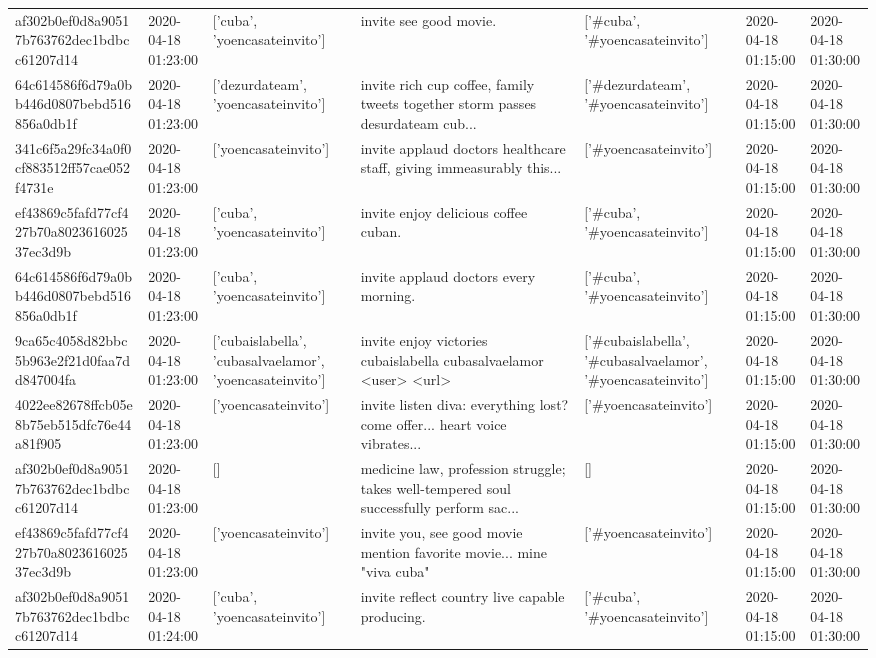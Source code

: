 \begin{tabular}{lllllll}
af302b0ef0d8a90517b763762dec1bdbcc61207d14 & 2020-04-18 01:23:00 & ['cuba', 'yoencasateinvito'] & invite see good movie. & ['#cuba', '#yoencasateinvito'] & 2020-04-18 01:15:00 & 2020-04-18 01:30:00 \\
64c614586f6d79a0bb446d0807bebd516856a0db1f & 2020-04-18 01:23:00 & ['dezurdateam', 'yoencasateinvito'] & invite rich cup coffee, family tweets together storm passes desurdateam cub... & ['#dezurdateam', '#yoencasateinvito'] & 2020-04-18 01:15:00 & 2020-04-18 01:30:00 \\
341c6f5a29fc34a0f0cf883512ff57cae052f4731e & 2020-04-18 01:23:00 & ['yoencasateinvito'] & invite applaud doctors healthcare staff, giving immeasurably this... & ['#yoencasateinvito'] & 2020-04-18 01:15:00 & 2020-04-18 01:30:00 \\
ef43869c5fafd77cf427b70a802361602537ec3d9b & 2020-04-18 01:23:00 & ['cuba', 'yoencasateinvito'] & invite enjoy delicious coffee cuban. & ['#cuba', '#yoencasateinvito'] & 2020-04-18 01:15:00 & 2020-04-18 01:30:00 \\
64c614586f6d79a0bb446d0807bebd516856a0db1f & 2020-04-18 01:23:00 & ['cuba', 'yoencasateinvito'] & invite applaud doctors every morning. & ['#cuba', '#yoencasateinvito'] & 2020-04-18 01:15:00 & 2020-04-18 01:30:00 \\
9ca65c4058d82bbc5b963e2f21d0faa7dd847004fa & 2020-04-18 01:23:00 & ['cubaislabella', 'cubasalvaelamor', 'yoencasateinvito'] & invite enjoy victories cubaislabella cubasalvaelamor <user> <url> & ['#cubaislabella', '#cubasalvaelamor', '#yoencasateinvito'] & 2020-04-18 01:15:00 & 2020-04-18 01:30:00 \\
4022ee82678ffcb05e8b75eb515dfc76e44a81f905 & 2020-04-18 01:23:00 & ['yoencasateinvito'] & invite listen diva: everything lost? come offer... heart voice vibrates... & ['#yoencasateinvito'] & 2020-04-18 01:15:00 & 2020-04-18 01:30:00 \\
af302b0ef0d8a90517b763762dec1bdbcc61207d14 & 2020-04-18 01:23:00 & [] & medicine law, profession struggle; takes well-tempered soul successfully perform sac... & [] & 2020-04-18 01:15:00 & 2020-04-18 01:30:00 \\
ef43869c5fafd77cf427b70a802361602537ec3d9b & 2020-04-18 01:23:00 & ['yoencasateinvito'] & invite you, see good movie mention favorite movie... mine "viva cuba" & ['#yoencasateinvito'] & 2020-04-18 01:15:00 & 2020-04-18 01:30:00 \\
af302b0ef0d8a90517b763762dec1bdbcc61207d14 & 2020-04-18 01:24:00 & ['cuba', 'yoencasateinvito'] & invite reflect country live capable producing. & ['#cuba', '#yoencasateinvito'] & 2020-04-18 01:15:00 & 2020-04-18 01:30:00 \\

\end{tabular}
